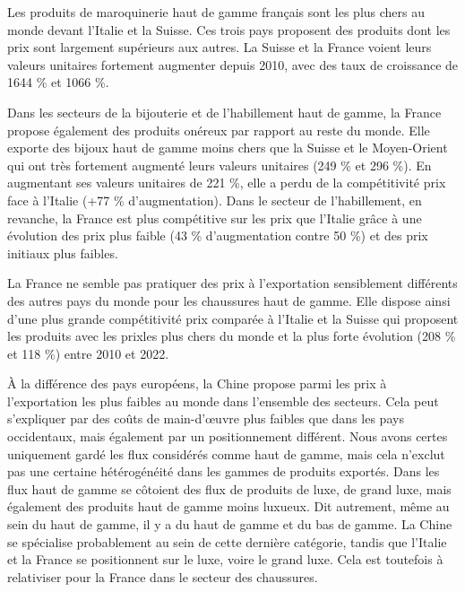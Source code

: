 \documentclass[french,10pt,a4paper]{article}
\begin{document}
Les produits de maroquinerie haut de gamme français sont les plus chers au monde devant l'Italie et la Suisse. Ces trois pays proposent des produits dont les prix sont largement supérieurs aux autres. La Suisse et la France voient leurs valeurs unitaires fortement augmenter depuis 2010, avec des taux de croissance de 1644 \% et 1066 \%. 

Dans les secteurs de la bijouterie et de l'habillement haut de gamme, la France propose également des produits onéreux par rapport au reste du monde. Elle exporte des bijoux haut de gamme moins chers que la Suisse et le Moyen-Orient qui ont très fortement augmenté leurs valeurs unitaires (249 \% et 296 \%). En augmentant ses valeurs unitaires de 221 \%, elle a perdu de la compétitivité prix face à l'Italie (+77 \% d'augmentation). Dans le secteur de l'habillement, en revanche, la France est plus compétitive sur les prix que l'Italie grâce à une évolution des prix plus faible (43 \% d'augmentation contre 50 \%) et des prix initiaux plus faibles. 

La France ne semble pas pratiquer des prix à l'exportation sensiblement différents des autres pays du monde pour les chaussures haut de gamme. Elle dispose ainsi d'une plus grande compétitivité prix comparée à l'Italie et la Suisse qui proposent les produits avec les prixles plus chers du monde et la plus forte évolution (208 \% et 118 \%) entre 2010 et 2022. 

À la différence des pays européens, la Chine propose parmi les prix à l'exportation les plus faibles au monde dans l'ensemble des secteurs. Cela peut s'expliquer par des coûts de main-d'œuvre plus faibles que dans les pays occidentaux, mais également par un positionnement différent. Nous avons certes uniquement gardé les flux considérés comme haut de gamme, mais cela n'exclut pas une certaine hétérogénéité dans les gammes de produits exportés. Dans les flux haut de gamme se côtoient des flux de produits de luxe, de grand luxe, mais également des produits haut de gamme moins luxueux. Dit autrement, même au sein du haut de gamme, il y a du haut de gamme et du bas de gamme. La Chine se spécialise probablement au sein de cette dernière catégorie, tandis que l'Italie et la France se positionnent sur le luxe, voire le grand luxe. Cela est toutefois à relativiser pour la France dans le secteur des chaussures.
\end{document}
